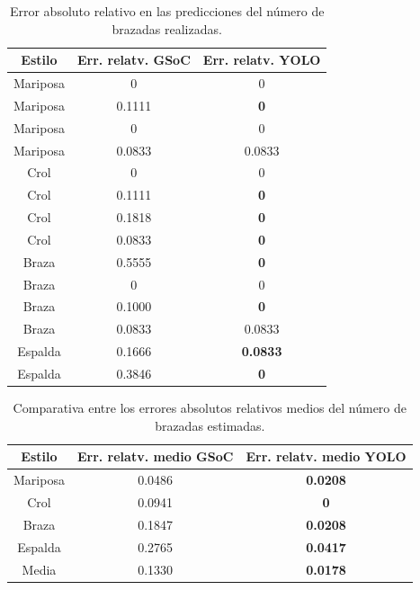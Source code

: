 \begin{table}[]
    \centering
    \small
    \begin{tabular}{|c|c|c|} \hline
         Estilo & Err. relatv. GSoC & Err. relatv. YOLO  \\ \hline 
         Mariposa & 0 & 0 \\
         Mariposa & 0.1111 & \textbf{0} \\
         Mariposa & 0 & 0 \\
         Mariposa & 0.0833 & 0.0833 \\
         Crol & 0 & 0 \\
         Crol & 0.1111 & \textbf{0} \\
         Crol & 0.1818 & \textbf{0} \\
         Crol & 0.0833 & \textbf{0} \\
         Braza & 0.5555 & \textbf{0} \\
         Braza & 0 & 0 \\
         Braza & 0.1000 & \textbf{0} \\
         Braza & 0.0833 & 0.0833 \\
         Espalda & 0.1666 & \textbf{0.0833} \\
         Espalda & 0.3846 & \textbf{0} \\ \hline
    \end{tabular}
    \caption{Error absoluto relativo en las predicciones del número de brazadas realizadas.} 
    \label{tab:tablaerroresbrazadascap5}
\end{table}

\begin{table}[]
    \centering
    \small
    \begin{tabular}{|c|c|c|} \hline
         Estilo & Err. relatv. medio GSoC & Err. relatv. medio YOLO  \\ \hline
         Mariposa & 0.0486 & \textbf{0.0208} \\
         Crol & 0.0941 & \textbf{0}  \\   
         Braza & 0.1847 & \textbf{0.0208} \\
         Espalda & 0.2765 & \textbf{0.0417} \\
         Media & 0.1330 & \textbf{0.0178} \\ \hline
    \end{tabular}
    \caption{Comparativa entre los errores absolutos relativos medios del número de brazadas estimadas.}
    \label{tab:tablaerroresmediosbrazadas}
\end{table} 


